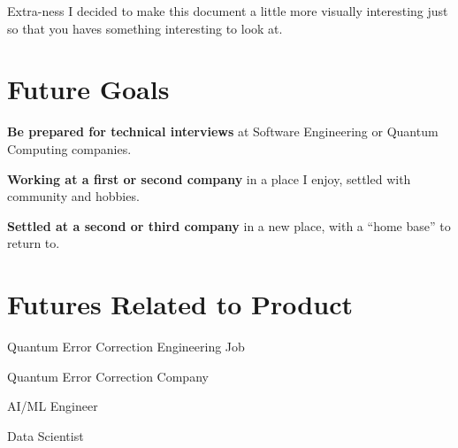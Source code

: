 \documentclass[12pt]{article}
\begin{document}
\maketitlepage

\begin{aside}{Extra-ness}
    I decided to make this document a little more visually interesting just so that you haves something 
    interesting to look at.
\end{aside}

\section{Future Goals}

\begin{tcbraster}[
    raster columns=3,
    raster column skip=0.03\textwidth,
    raster valign=top,
    fonttitle=\bfseries\small,
    boxrule=0.6pt,
    arc=4pt,
]
\begin{tcolorbox}[
    title={\ding{72}\ After Graduation},
    colback=goalgrad!8,
    colframe=goalgrad,
    colbacktitle=goalgrad,
    coltitle=white,
]
\textbf{Be prepared for technical interviews} at Software Engineering or Quantum Computing companies.
\end{tcolorbox}
\begin{tcolorbox}[
    title={\ding{72}\ Five Years},
    colback=goalfive!8,
    colframe=goalfive,
    colbacktitle=goalfive,
    coltitle=white,
]
\textbf{Working at a first or second company} in a place I enjoy, settled with community and hobbies.
\end{tcolorbox}
\begin{tcolorbox}[
    title={\ding{72}\ Ten Years},
    colback=goaldec!8,
    colframe=goaldec,
    colbacktitle=goaldec,
    coltitle=white,
]
\textbf{Settled at a second or third company} in a new place, with a ``home base'' to return to.
\end{tcolorbox}
\end{tcbraster}

\section{Futures Related to Product}

\begin{tcbraster}[
    raster columns=2,
    raster column skip=0.03\textwidth,
    raster equal height=rows,
    fonttitle=\bfseries,
    boxrule=0.6pt,
    arc=4pt,
    colback=tableheader!6,
    colframe=tableheader,
    colbacktitle=tableheader,
    coltitle=white,
]
\begin{tcolorbox}[title={Outcome 1}]
Quantum Error Correction Engineering Job
\end{tcolorbox}
\begin{tcolorbox}[title={Outcome 2}]
Quantum Error Correction Company
\end{tcolorbox}
\begin{tcolorbox}[title={Outcome 3}]
AI/ML Engineer
\end{tcolorbox}
\begin{tcolorbox}[title={Outcome 4}]
Data Scientist
\end{tcolorbox}
\end{tcbraster}
\end{document}

